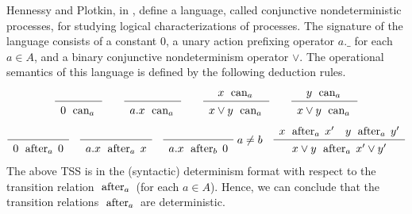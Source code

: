 \begin{example}\label{cnp}
Hennessy and Plotkin, in \cite{Hennessy87},  define a language, called conjunctive nondeterministic processes,
for studying logical characterizations of processes.
The signature of the language consists of a constant $0$, a unary action prefixing operator $a.\_$ for each $a \in A$, and
a binary conjunctive nondeterminism operator $\lor$.
The operational semantics of this language is defined by the following deduction rules.
\[
\sosrule{}{0 \cando{a}}
\qquad
\sosrule{}{a.x \cando{a}}
\qquad
\sosrule{x \cando{a}}{x \lor y \cando{a}}
\qquad
\sosrule{y \cando{a}}{x \lor y \cando{a}}
\]
\[
\sosrule{}{0 \after{a} 0}
\quad
\sosrule{}{a.x \after{a} x}
\quad
\sosrule{}{a.x \after{b} 0} ~a \neq b
\quad
\sosrule{x \after{a} x' \quad y \after{a} y'}{x \lor y  \after{a} x' \lor y'}
\]
The above TSS is in the (syntactic) determinism format with respect to the transition relation $\mathrel{\mbox{ after}_{a}\,}$ (for each $a \in A$).
Hence, we can conclude that the transition relations $\mathrel{\mbox{ after}_{a}\,}$ are deterministic.
\end{example}

